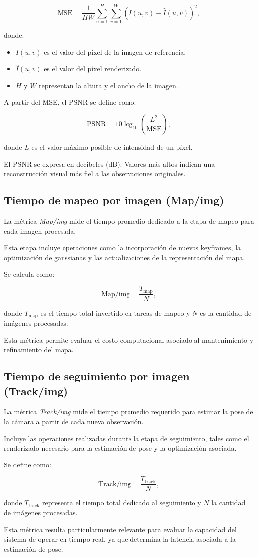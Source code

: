 $$
\mathrm{MSE}
=
\frac{1}{HW}
\sum_{u=1}^{H}
\sum_{v=1}^{W}
\left(
I(u,v)-\hat{I}(u,v)
\right)^2,
$$

\noindent donde:

\begin{itemize}
\item $I(u,v)$ es el valor del píxel de la imagen de referencia.
\item $\hat{I}(u,v)$ es el valor del píxel renderizado.
\item $H$ y $W$ representan la altura y el ancho de la imagen.
\end{itemize}

A partir del MSE, el PSNR se define como:

$$
\mathrm{PSNR}
=
10 \log_{10}
\left(
\frac{L^2}{\mathrm{MSE}}
\right),
$$

\noindent donde $L$ es el valor máximo posible de intensidad de un píxel.

El PSNR se expresa en decibeles (dB). Valores más altos indican una reconstrucción visual más fiel a las observaciones originales.

\subsection{Tiempo de mapeo por imagen (Map/img)}

La métrica \textit{Map/img} mide el tiempo promedio dedicado a la etapa de mapeo para cada imagen procesada.

Esta etapa incluye operaciones como la incorporación de nuevos keyframes, la optimización de gaussianas y las actualizaciones de la representación del mapa.

Se calcula como:

$$
\mathrm{Map/img}
=
\frac{T_{\mathrm{map}}}{N},
$$

\noindent donde $T_{\mathrm{map}}$ es el tiempo total invertido en tareas de mapeo y $N$ es la cantidad de imágenes procesadas.

Esta métrica permite evaluar el costo computacional asociado al mantenimiento y refinamiento del mapa.

\subsection{Tiempo de seguimiento por imagen (Track/img)}

La métrica \textit{Track/img} mide el tiempo promedio requerido para estimar la pose de la cámara a partir de cada nueva observación.

Incluye las operaciones realizadas durante la etapa de seguimiento, tales como el renderizado necesario para la estimación de pose y la optimización asociada.

Se define como:

$$
\mathrm{Track/img}
=
\frac{T_{\mathrm{track}}}{N},
$$

\noindent donde $T_{\mathrm{track}}$ representa el tiempo total dedicado al seguimiento y $N$ la cantidad de imágenes procesadas.

Esta métrica resulta particularmente relevante para evaluar la capacidad del sistema de operar en tiempo real, ya que determina la latencia asociada a la estimación de pose.
